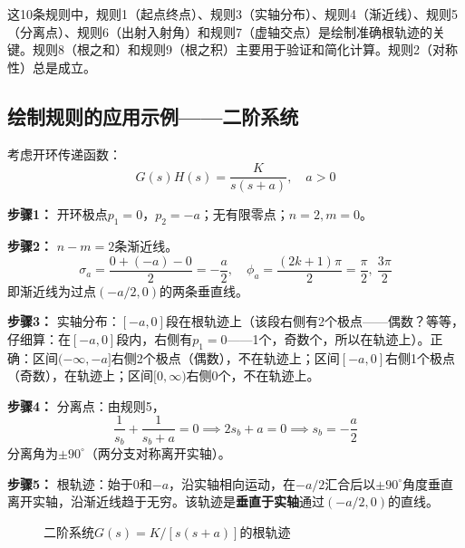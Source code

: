 \begin{remark}
这10条规则中，规则1（起点终点）、规则3（实轴分布）、规则4（渐近线）、规则5（分离点）、规则6（出射入射角）和规则7（虚轴交点）是绘制准确根轨迹的关键。规则8（根之和）和规则9（根之积）主要用于验证和简化计算。规则2（对称性）总是成立。
\end{remark}

\subsection{绘制规则的应用示例——二阶系统}

考虑开环传递函数：
\[
G(s)H(s) = \frac{K}{s(s+a)}, \quad a > 0
\]

\textbf{步骤1：} 开环极点$p_1 = 0$，$p_2 = -a$；无有限零点；$n=2, m=0$。

\textbf{步骤2：} $n-m = 2$条渐近线。
\[
\sigma_a = \frac{0 + (-a) - 0}{2} = -\frac{a}{2}, \quad
\phi_a = \frac{(2k+1)\pi}{2} = \frac{\pi}{2},\ \frac{3\pi}{2}
\]
即渐近线为过点$(-a/2, 0)$的两条垂直线。

\textbf{步骤3：} 实轴分布：$[-a, 0]$段在根轨迹上（该段右侧有2个极点——偶数？等等，仔细算：在$[-a,0]$段内，右侧有$p_1=0$——1个，奇数个，所以在轨迹上）。正确：区间$(-\infty, -a]$右侧2个极点（偶数），不在轨迹上；区间$[-a, 0]$右侧1个极点（奇数），在轨迹上；区间$[0, \infty)$右侧0个，不在轨迹上。

\textbf{步骤4：} 分离点：由规则5，
\[
\frac{1}{s_b} + \frac{1}{s_b + a} = 0 \implies 2s_b + a = 0 \implies s_b = -\frac{a}{2}
\]
分离角为$\pm90^\circ$（两分支对称离开实轴）。

\textbf{步骤5：} 根轨迹：始于$0$和$-a$，沿实轴相向运动，在$-a/2$汇合后以$\pm90^\circ$角度垂直离开实轴，沿渐近线趋于无穷。该轨迹是\textbf{垂直于实轴}通过$(-a/2,0)$的直线。

\begin{figure}[H]
\centering
{}
\caption{二阶系统$G(s)=K/[s(s+a)]$的根轨迹}
\label{fig:root-locus-2nd}
\end{figure}

